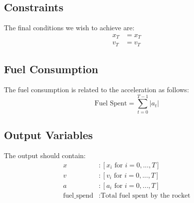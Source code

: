\documentclass{article}
\begin{document}
\subsection*{Constraints}
The final conditions we wish to achieve are:
\begin{align}
x_T &= x_T \label{eq:final_position} \\
v_T &= v_T \label{eq:final_velocity}
\end{align}

\subsection*{Fuel Consumption}
The fuel consumption is related to the acceleration as follows:
\begin{equation}
\text{Fuel Spent} = \sum_{t=0}^{T-1} |a_t| \label{eq:fuel}
\end{equation}

\subsection*{Output Variables}
The output should contain:
\begin{align*}
x & : [x_i \text{ for } i = 0, ..., T] \\
v & : [v_i \text{ for } i = 0, ..., T] \\
a & : [a_i \text{ for } i = 0, ..., T] \\
\text{fuel\_spend} & : \text{Total fuel spent by the rocket}
\end{align*}
\end{document}
